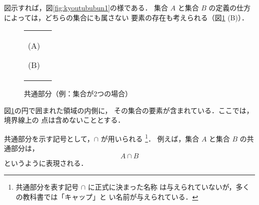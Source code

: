                     図示すれば，図\ref{fig:kyoutububun1}の様である．
                    集合 $A$ と集合 $B$ の定義の仕方によっては，どちらの集合にも属さない
                    要素の存在も考えられる（図\ref{fig:Kyoutububun1} (B)）．
                        \begin{figure}[hbt]
                            \begin{tabular}{cc}
                                \begin{minipage}{0.5\hsize}
                                    \begin{center}
                                        {kyoutububun1.pdf}

                                        (A)
                                    \end{center}
                                \end{minipage}
                                \begin{minipage}{0.5\hsize}
                                    \begin{center}
                                        {kyoutububun2_phi.pdf}

                                        (B)
                                    \end{center}
                                \end{minipage}
                            \end{tabular}
                                        \caption{共通部分（例：集合が2つの場合）}
                                        \label{fig:Kyoutububun1}
                        \end{figure}

                    図\ref{fig:Kyoutububun1}の円で囲まれた領域の内側に，
                    その集合の要素が含まれている．ここでは，境界線上の
                    点は含めないこととする．

                    共通部分を示す記号として，$\cap$ が用いられる
                        \footnote{
                            共通部分を表す記号 $\cap$ に正式に決まった名称
                            は与えられていないが，多くの教科書では「キャップ」と
                            い名前が与えられている．
                        }．
                    例えば，集合 $A$ と集合 $B$ の共通部分は，
                        \begin{equation*}
                            A \cap B
                        \end{equation*}
                    というように表現される．


